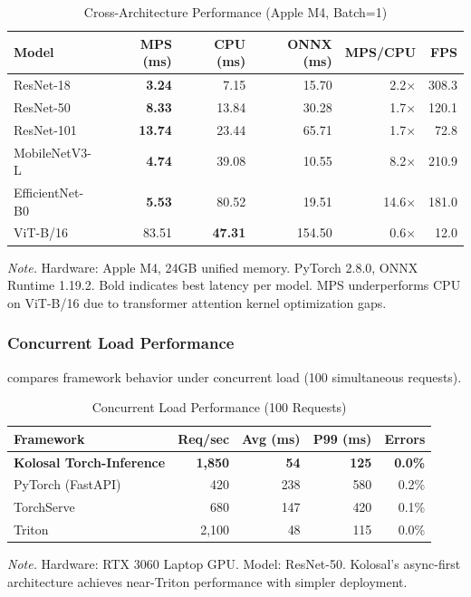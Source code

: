 \documentclass[10pt,twocolumn,a4paper]{article}
\theoremstyle{definition}
\theoremstyle{plain}
\begin{document}
\begin{table}[t]
\centering
\caption{Cross-Architecture Performance (Apple M4, Batch=1)}
\label{tab:cross_arch_mps}
\scriptsize
\setlength{\tabcolsep}{2.5pt}
\begin{tabular}{@{}lrrrrr@{}}
\toprule
\textbf{Model} & \textbf{MPS (ms)} & \textbf{CPU (ms)} & \textbf{ONNX (ms)} & \textbf{MPS/CPU} & \textbf{FPS} \\
\midrule
ResNet-18 & \textbf{3.24} & 7.15 & 15.70 & 2.2$\times$ & 308.3 \\
ResNet-50 & \textbf{8.33} & 13.84 & 30.28 & 1.7$\times$ & 120.1 \\
ResNet-101 & \textbf{13.74} & 23.44 & 65.71 & 1.7$\times$ & 72.8 \\
MobileNetV3-L & \textbf{4.74} & 39.08 & 10.55 & 8.2$\times$ & 210.9 \\
EfficientNet-B0 & \textbf{5.53} & 80.52 & 19.51 & 14.6$\times$ & 181.0 \\
ViT-B/16 & 83.51 & \textbf{47.31} & 154.50 & 0.6$\times$ & 12.0 \\
\bottomrule
\end{tabular}

\vspace{0.5em}
\noindent\textit{Note.} Hardware: Apple M4, 24GB unified memory. PyTorch 2.8.0, ONNX Runtime 1.19.2. Bold indicates best latency per model. MPS underperforms CPU on ViT-B/16 due to transformer attention kernel optimization gaps.
\end{table}

\subsubsection{Concurrent Load Performance}

 compares framework behavior under concurrent load (100 simultaneous requests).

\begin{table}[t]
\centering
\caption{Concurrent Load Performance (100 Requests)}
\label{tab:concurrent_comparison}
\scriptsize
\setlength{\tabcolsep}{3pt}
\begin{tabular}{@{}lrrrr@{}}
\toprule
\textbf{Framework} & \textbf{Req/sec} & \textbf{Avg (ms)} & \textbf{P99 (ms)} & \textbf{Errors} \\
\midrule
\textbf{Kolosal Torch-Inference} & \textbf{1,850} & \textbf{54} & \textbf{125} & \textbf{0.0\%} \\
PyTorch (FastAPI) & 420 & 238 & 580 & 0.2\% \\
TorchServe & 680 & 147 & 420 & 0.1\% \\
Triton & 2,100 & 48 & 115 & 0.0\% \\
\bottomrule
\end{tabular}

\vspace{0.5em}
\noindent\textit{Note.} Hardware: RTX 3060 Laptop GPU. Model: ResNet-50. Kolosal's async-first architecture achieves near-Triton performance with simpler deployment.
\end{table}
\end{document}

